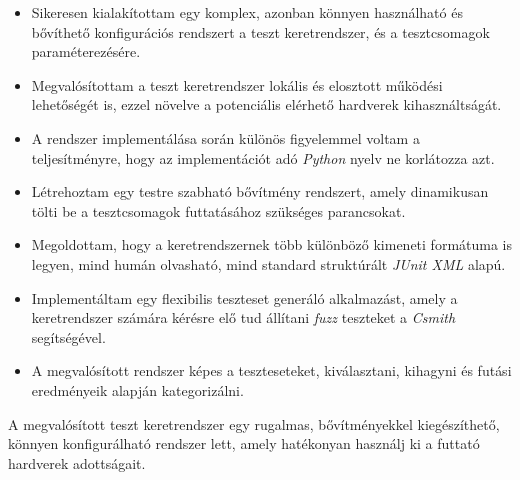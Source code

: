    \begin{itemize}
        \item Sikeresen kialakítottam egy komplex, azonban könnyen használható és bővíthető konfigurációs rendszert a
              teszt keretrendszer, és a tesztcsomagok paraméterezésére.
        \item Megvalósítottam a teszt keretrendszer lokális és elosztott működési lehetőségét is, ezzel növelve a
              potenciális elérhető hardverek kihasználtságát.
        \item A rendszer implementálása során különös figyelemmel voltam a teljesítményre, hogy az implementációt adó
              \textit{Python} nyelv ne korlátozza azt.
        \item Létrehoztam egy testre szabható bővítmény rendszert, amely dinamikusan tölti be a tesztcsomagok
              futtatásához szükséges parancsokat.
        \item Megoldottam, hogy a keretrendszernek több különböző kimeneti formátuma is legyen, mind humán olvasható,
              mind standard struktúrált \textit{JUnit XML} alapú.
        \item Implementáltam egy flexibilis teszteset generáló alkalmazást, amely a keretrendszer számára kérésre elő
              tud állítani \textit{fuzz} teszteket a \textit{Csmith} segítségével.
        \item A megvalósított rendszer képes a teszteseteket, kiválasztani, kihagyni és futási eredményeik alapján
              kategorizálni.
    \end{itemize}

    A megvalósított teszt keretrendszer egy rugalmas, bővítményekkel kiegészíthető, könnyen konfigurálható rendszer
    lett, amely hatékonyan használj ki a futtató hardverek adottságait.
